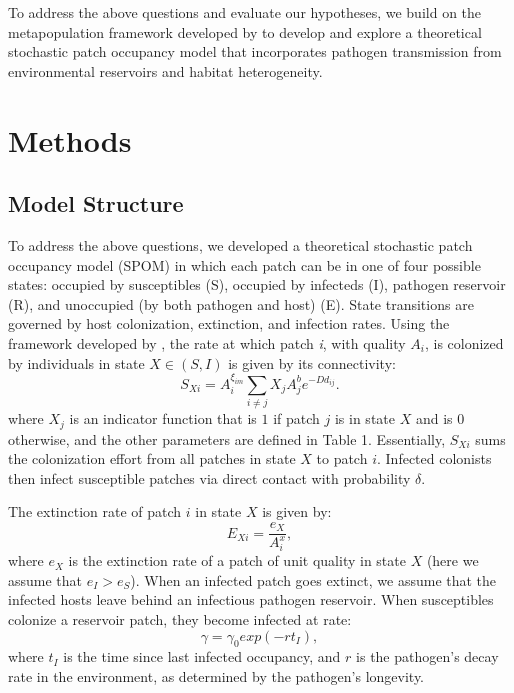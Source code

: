 \documentclass{svjour3}
\begin{document}
To address the above questions and evaluate our hypotheses, we build on the metapopulation framework developed by \cite{Hanski1994} to develop and explore a theoretical stochastic patch occupancy model that incorporates pathogen transmission from environmental reservoirs and habitat heterogeneity.   

\section{Methods}
\label{methods}

\subsection{Model Structure}
To address the above questions, we developed a theoretical stochastic patch occupancy model (SPOM) in which each patch can be in one of four possible states: occupied by susceptibles (S), occupied by infecteds (I), pathogen reservoir (R), and unoccupied (by both pathogen and host) (E).  State transitions are governed by host colonization, extinction, and infection rates.  Using the framework developed by \cite{Hanski1994}, the rate at which patch \emph{i}, with quality $A_i$, is colonized by individuals in state $X \in (S,I)$ is given by its connectivity:
\begin{equation}
S_{Xi}=A_i^{\xi_{im}} \sum_{i\neq j }X_jA_j^be^{-D d_{ij}}.
\end{equation}
where $X_j$ is an indicator function that is $1$ if patch $j$ is in state $X$ and is $0$ otherwise, and the other parameters are defined in Table 1.  Essentially, $S_{Xi}$ sums the colonization effort from all patches in state $X$ to patch $i$.  Infected colonists then infect susceptible patches via direct contact with probability $\delta$.  

The extinction rate of patch $i$ in state $X$ is given by:
\begin{equation}
E_{Xi}=\frac{e_X}{A_i^x},
\end{equation}
where $e_X$ is the extinction rate of a patch of unit quality in state $X$ (here we assume that $e_I>e_S$).  When an infected patch goes extinct, we assume that the infected hosts leave behind an infectious pathogen reservoir.  When susceptibles  colonize a reservoir patch, they become infected at rate:
\begin{equation}
\gamma=\gamma_0exp(-rt_I),
\end{equation}
where $t_I$ is the time since last infected occupancy, and $r$ is the pathogen's decay rate in the environment, as determined by the pathogen's longevity.
\end{document}
